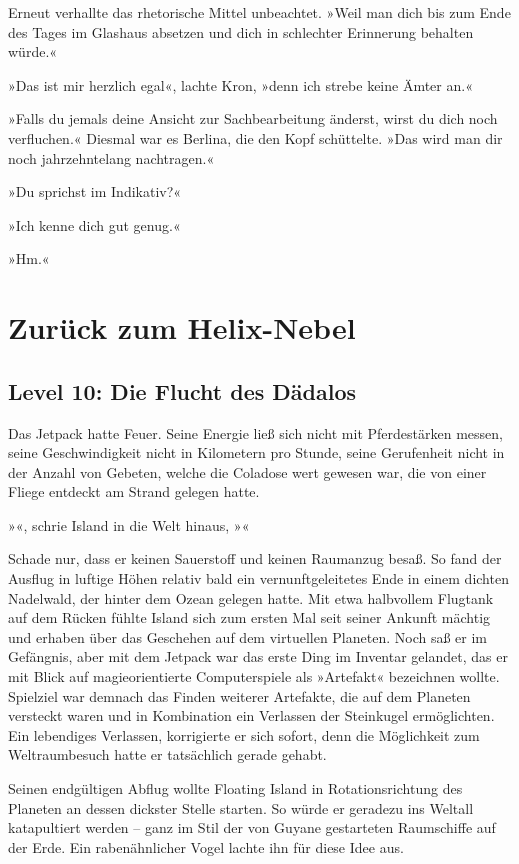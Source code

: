 Erneut verhallte das rhetorische Mittel unbeachtet. »Weil man dich bis zum Ende des Tages im Glashaus absetzen und dich in schlechter Erinnerung behalten würde.«

»Das ist mir herzlich egal«, lachte Kron, »denn ich strebe keine Ämter an.«

»Falls du jemals deine Ansicht zur Sachbearbeitung änderst, wirst du dich noch verfluchen.« Diesmal war es Berlina, die den Kopf schüttelte. »Das wird man dir noch jahrzehntelang nachtragen.«

»Du sprichst im Indikativ?«

»Ich kenne dich gut genug.«

»Hm.«

\chapter{Zurück zum Helix-Nebel}

\section{Level 10: Die Flucht des Dädalos}

Das Jetpack hatte Feuer. Seine Energie ließ sich nicht mit Pferdestärken messen, seine Geschwindigkeit nicht in Kilometern pro Stunde, seine Gerufenheit nicht in der Anzahl von Gebeten, welche die Coladose wert gewesen war, die von einer Fliege entdeckt am Strand gelegen hatte.

»«, schrie Island in die Welt hinaus, »«

Schade nur, dass er keinen Sauerstoff und keinen Raumanzug besaß. So fand der Ausflug in luftige Höhen relativ bald ein vernunftgeleitetes Ende in einem dichten Nadelwald, der hinter dem Ozean gelegen hatte. Mit etwa halbvollem Flugtank auf dem Rücken fühlte Island sich zum ersten Mal seit seiner Ankunft mächtig und erhaben über das Geschehen auf dem virtuellen Planeten. Noch saß er im Gefängnis, aber mit dem Jetpack war das erste Ding im Inventar gelandet, das er mit Blick auf magieorientierte Computerspiele als »Artefakt« bezeichnen wollte. Spielziel war demnach das Finden weiterer Artefakte, die auf dem Planeten versteckt waren und in Kombination ein Verlassen der Steinkugel ermöglichten. Ein lebendiges Verlassen, korrigierte er sich sofort, denn die Möglichkeit zum Weltraumbesuch hatte er tatsächlich gerade gehabt.

Seinen endgültigen Abflug wollte Floating Island in Rotationsrichtung des Planeten an dessen dickster Stelle starten. So würde er geradezu ins Weltall katapultiert werden – ganz im Stil der von Guyane gestarteten Raumschiffe auf der Erde. Ein rabenähnlicher Vogel lachte ihn für diese Idee aus.

